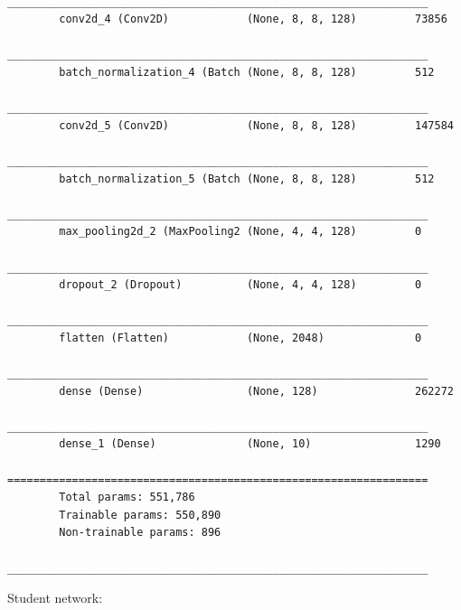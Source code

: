 \begin{center}
\begin{verbatim}
        _________________________________________________________________
        conv2d_4 (Conv2D)            (None, 8, 8, 128)         73856     
        _________________________________________________________________
        batch_normalization_4 (Batch (None, 8, 8, 128)         512       
        _________________________________________________________________
        conv2d_5 (Conv2D)            (None, 8, 8, 128)         147584    
        _________________________________________________________________
        batch_normalization_5 (Batch (None, 8, 8, 128)         512       
        _________________________________________________________________
        max_pooling2d_2 (MaxPooling2 (None, 4, 4, 128)         0         
        _________________________________________________________________
        dropout_2 (Dropout)          (None, 4, 4, 128)         0         
        _________________________________________________________________
        flatten (Flatten)            (None, 2048)              0         
        _________________________________________________________________
        dense (Dense)                (None, 128)               262272    
        _________________________________________________________________
        dense_1 (Dense)              (None, 10)                1290      
        =================================================================
        Total params: 551,786
        Trainable params: 550,890
        Non-trainable params: 896
        _________________________________________________________________
    \end{verbatim}
\end{center}
Student network:
